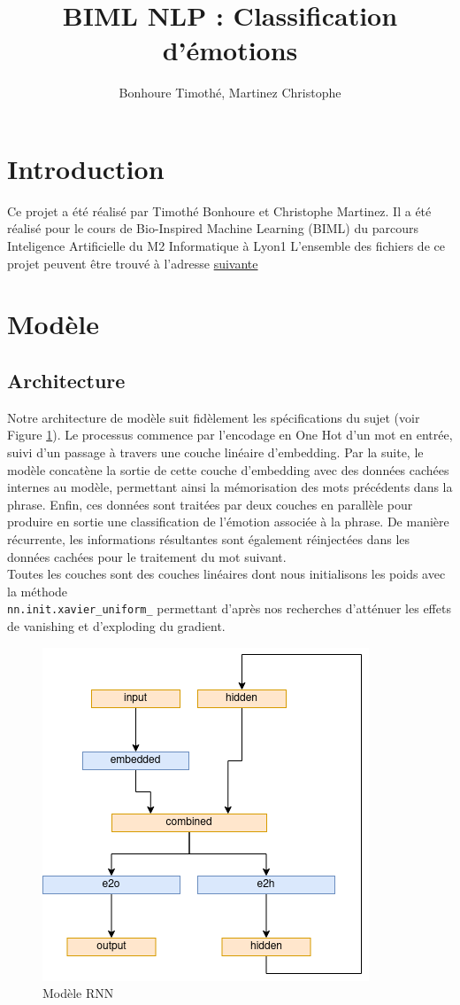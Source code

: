 \documentclass{article}
\begin{document}
\renewcommand{\arraystretch}{1.5}

\title{BIML NLP : Classification d'émotions \\
\footnotesize{}}
\author{Bonhoure Timothé, Martinez Christophe}                      %

\maketitle
\tableofcontents
\section*{Introduction}
Ce projet a été réalisé par Timothé Bonhoure et Christophe Martinez. 
Il a été réalisé pour le cours de Bio-Inspired Machine Learning (BIML) du parcours Inteligence Artificielle du M2 Informatique à Lyon1
L'ensemble des fichiers de ce projet peuvent être trouvé à l'adresse \href{https://forge.univ-lyon1.fr/timothe.bonhoure/biml-nlp}{suivante}
\newpage

\section{Modèle}
\subsection{Architecture}
Notre architecture de modèle suit fidèlement les spécifications du sujet (voir Figure \ref{fig:modele_rnn}). Le processus commence par l'encodage en One Hot d'un mot en entrée, suivi d'un passage à travers une couche linéaire d'embedding. Par la suite, le modèle concatène la sortie de cette couche d'embedding avec des données cachées internes au modèle, permettant ainsi la mémorisation des mots précédents dans la phrase. Enfin, ces données sont traitées par deux couches en parallèle pour produire en sortie une classification de l'émotion associée à la phrase. De manière récurrente, les informations résultantes sont également réinjectées dans les données cachées pour le traitement du mot suivant. \\
Toutes les couches sont des couches linéaires dont nous initialisons les poids avec la méthode\\ \texttt{nn.init.xavier\_uniform\_} permettant d'après nos recherches d'atténuer les effets de vanishing et d'exploding du gradient.

\begin{figure}[H]
    \centering
    \includegraphics[width=0.4\linewidth]{img/modele.png}
    \caption{Modèle RNN}

    \label{fig:modele_rnn}
\end{figure}
\end{document}
